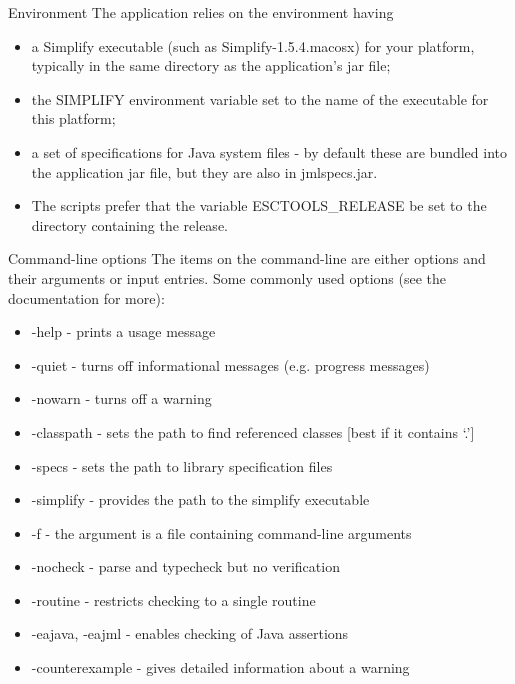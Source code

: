 \documentclass[
pdf,
nocolorBG,
slideColor,
cok,
]{prosper}
\begin{document}


\begin{slide}{Environment}
\vspace*{-6ex}
The application relies on the environment having 
\begin{itemize}
\item a Simplify executable (such as Simplify-1.5.4.macosx) for your platform, typically in the same directory as the application's jar file;
\item the {\blue SIMPLIFY} environment variable set to the name of the executable for this platform;
\item a set of specifications for Java system files - by default these are bundled into the application jar file, but they are also in {\blue jmlspecs.jar}.
\item The scripts prefer that the variable {\blue ESCTOOLS\_RELEASE} be set to the directory containing the release.
\end{itemize}
\end{slide}



\begin{slide}{Command-line options}
\vspace*{-9ex}
The items on the command-line are either options and their arguments or input entries.
Some commonly used options (see the documentation for more):
\tiny
\begin{itemize}
\item {\knalblue -help} - prints a usage message
\item {\knalblue -quiet} - turns off informational messages (e.g. progress messages)
\item {\knalblue -nowarn} - turns off a warning
\item {\knalblue -classpath} - sets the path to find referenced classes [best if it contains `.']
\item {\knalblue -specs} - sets the path to library specification files
\item {\knalblue -simplify} - provides the path to the simplify executable
\item {\knalblue -f} - the argument is a file containing command-line arguments
\item {\knalblue -nocheck} - parse and typecheck but no verification
\item {\knalblue -routine} - restricts checking to a single routine
\item {\knalblue -eajava}, {\knalblue -eajml} - enables checking of Java assertions
\item {\knalblue -counterexample} - gives detailed information about a warning
\end{itemize}
\end{slide}
\end{document}
